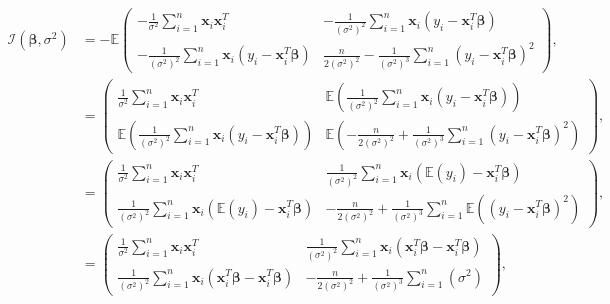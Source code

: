 \documentclass[honours,12pt]{unswthesis}
\newcommand{\E}{\mathbb{E}}
\newcommand{\s}{\sum_{i=1}^{n}}
\numberwithin{equation}{section}
\begin{document}
\begin{align*}
	\mathcal{I}(\bm{\beta},\sigma^{2}) &= -\E \begin{pmatrix} -\frac{1}{\sigma^{2}} \s \mathbf{x}_{i} \mathbf{x}_{i}^{T} & - \frac{1}{\left( \sigma^{2} \right)^{2}} \s \mathbf{x}_{i} \left( y_{i} - \mathbf{x}_{i}^{T} \bm{\beta} \right) \\ -\frac{1}{\left( \sigma^{2} \right)^{2}} \s \mathbf{x}_{i} \left( y_{i} - \mathbf{x}_{i}^{T} \bm{\beta} \right) & \frac{n}{2 \left( \sigma^{2} \right)^{2}} -\frac{1}{\left( \sigma^{2}\right)^{3}} \s \left( y_{i} - \mathbf{x}_{i}^{T} \bm{\beta}\right)^{2} \end{pmatrix},\\
	&= \begin{pmatrix} \frac{1}{\sigma^{2}} \s \mathbf{x}_{i} \mathbf{x}_{i}^{T} & \E \left( \frac{1}{\left( \sigma^{2} \right)^{2}} \s \mathbf{x}_{i} \left( y_{i} - \mathbf{x}_{i}^{T} \bm{\beta} \right) \right) \\ \E \left( \frac{1}{\left( \sigma^{2} \right)^{2}} \s \mathbf{x}_{i} \left( y_{i} - \mathbf{x}_{i}^{T} \bm{\beta} \right) \right) & \E \left( - \frac{n}{2\left( \sigma^{2} \right)^{2}}  + \frac{1}{\left( \sigma^{2}\right)^{3}} \s \left( y_{i} - \mathbf{x}_{i}^{T} \bm{\beta}\right)^{2} \right) \end{pmatrix},\\
	&= \begin{pmatrix} \frac{1}{\sigma^{2}} \s \mathbf{x}_{i} \mathbf{x}_{i}^{T} & \frac{1}{\left( \sigma^{2} \right)^{2}} \s \mathbf{x}_{i} \left( \E \left( y_{i}\right) - \mathbf{x}_{i}^{T} \bm{\beta} \right) \\ \frac{1}{\left( \sigma^{2} \right)^{2}} \s \mathbf{x}_{i} \left( \E \left( y_{i} \right) - \mathbf{x}_{i}^{T} \bm{\beta} \right) & - \frac{n}{2\left( \sigma^{2} \right)^{2}}  + \frac{1}{\left( \sigma^{2}\right)^{3}} \s \E \left( \left( y_{i} - \mathbf{x}_{i}^{T} \bm{\beta}\right)^{2} \right) \end{pmatrix},\\
	&= \begin{pmatrix} \frac{1}{\sigma^{2}} \s \mathbf{x}_{i} \mathbf{x}_{i}^{T} & \frac{1}{\left( \sigma^{2} \right)^{2}} \s \mathbf{x}_{i} \left( \mathbf{x}_{i}^{T} \bm{\beta} - \mathbf{x}_{i}^{T} \bm{\beta} \right) \\ \frac{1}{\left( \sigma^{2} \right)^{2}} \s \mathbf{x}_{i} \left( \mathbf{x}_{i}^{T} \bm{\beta} - \mathbf{x}_{i}^{T} \bm{\beta} \right) & - \frac{n}{2\left( \sigma^{2} \right)^{2}}  + \frac{1}{\left( \sigma^{2}\right)^{3}} \s \left( \sigma^{2} \right) \end{pmatrix},\\

\end{align*}
\end{document}

